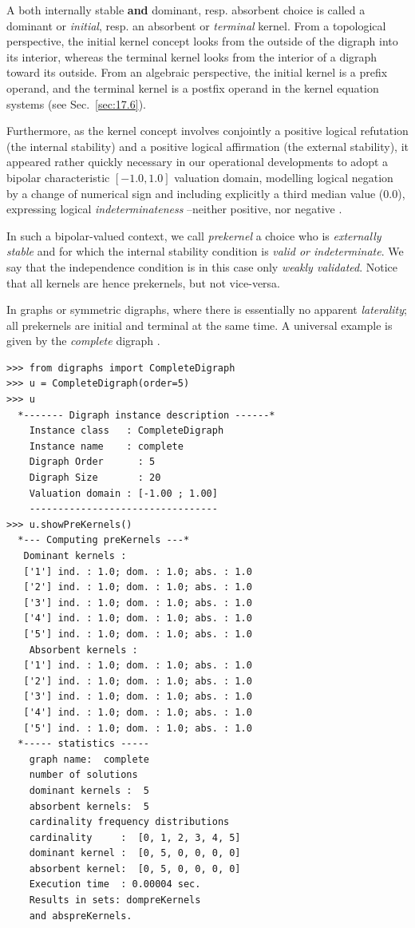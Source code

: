 A both internally stable \textbf{and} dominant, resp. absorbent choice is called a dominant or \emph{initial}, resp. an absorbent or \emph{terminal} kernel. From a topological perspective, the initial kernel concept looks from the outside of the digraph into its interior, whereas the terminal kernel looks from the interior of a digraph toward its outside. From an algebraic perspective, the initial kernel is a prefix operand, and the terminal kernel is a postfix operand in the kernel equation systems (see Sec.~\vref{sec:17.6}).

Furthermore, as the kernel concept involves conjointly a positive logical refutation (the internal stability) and a positive logical affirmation (the external stability), it appeared rather quickly necessary in our operational developments to adopt a bipolar characteristic $[-1.0,1.0]$ valuation domain, modelling logical negation by a change of numerical sign and including explicitly a third median value ($0.0$), expressing logical \emph{indeterminateness} --neither positive, nor negative \citep{BIS-2000,BIS-2002,BIS-2004a}.

In such a  bipolar-valued context, we call \emph{prekernel} a choice who is \emph{externally stable} and for which the internal stability condition is \emph{valid or indeterminate}. We say that the independence condition is in this case only \emph{weakly validated}. Notice that all kernels are hence prekernels, but not vice-versa.

In graphs or symmetric digraphs, where there is essentially no apparent \emph{laterality}; all prekernels are initial and terminal at the same time. A universal example is given by the \emph{complete} digraph .
\begin{lstlisting}[caption={The prekernels of a complete digraph},label=list:17.3]
>>> from digraphs import CompleteDigraph
>>> u = CompleteDigraph(order=5)
>>> u
  *------- Digraph instance description ------*
    Instance class   : CompleteDigraph
    Instance name    : complete
    Digraph Order      : 5
    Digraph Size       : 20
    Valuation domain : [-1.00 ; 1.00]
    ---------------------------------
>>> u.showPreKernels()
  *--- Computing preKernels ---*
   Dominant kernels :
   ['1'] ind. : 1.0; dom. : 1.0; abs. : 1.0
   ['2'] ind. : 1.0; dom. : 1.0; abs. : 1.0
   ['3'] ind. : 1.0; dom. : 1.0; abs. : 1.0
   ['4'] ind. : 1.0; dom. : 1.0; abs. : 1.0
   ['5'] ind. : 1.0; dom. : 1.0; abs. : 1.0
    Absorbent kernels :
   ['1'] ind. : 1.0; dom. : 1.0; abs. : 1.0
   ['2'] ind. : 1.0; dom. : 1.0; abs. : 1.0
   ['3'] ind. : 1.0; dom. : 1.0; abs. : 1.0
   ['4'] ind. : 1.0; dom. : 1.0; abs. : 1.0
   ['5'] ind. : 1.0; dom. : 1.0; abs. : 1.0
  *----- statistics -----
    graph name:  complete
    number of solutions
    dominant kernels :  5
    absorbent kernels:  5
    cardinality frequency distributions
    cardinality     :  [0, 1, 2, 3, 4, 5]
    dominant kernel :  [0, 5, 0, 0, 0, 0]
    absorbent kernel:  [0, 5, 0, 0, 0, 0]
    Execution time  : 0.00004 sec.
    Results in sets: dompreKernels
    and abspreKernels.
\end{lstlisting}

